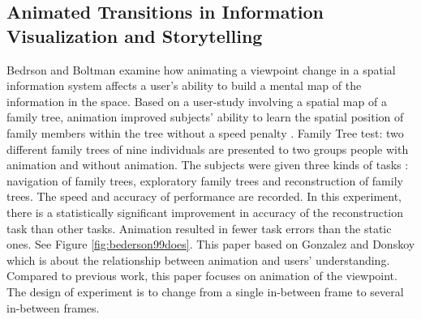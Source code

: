 \documentclass{egpubl}
\begin{document}
\subsection{Animated Transitions in Information Visualization and Storytelling}
Bedrson and Boltman examine how animating a viewpoint change in a spatial information system affects a user's ability to build a mental map of the information in the space. Based on a user-study involving a spatial map of a family tree, animation improved subjects' ability to learn the spatial position of family members within the tree without a speed penalty \cite{bedrson}.
Family Tree test: two different family trees of nine individuals are presented to two groups people with animation and without animation. The subjects were given three kinds of tasks : navigation of family trees, exploratory family trees and reconstruction of family trees. The speed and accuracy of performance are recorded. In this experiment, there is a statistically significant improvement in accuracy of the reconstruction task than other tasks. Animation resulted in fewer task errors than the static ones. See Figure \ref{fig:bederson99does}.
This paper based on Gonzalez \cite{gonzalez} and Donskoy \cite{donskoy} which is about the relationship between animation and users' understanding. Compared to previous work, this paper focuses on animation of the viewpoint. The design of experiment is to change from a single in-between frame to several in-between frames.
\end{document}
